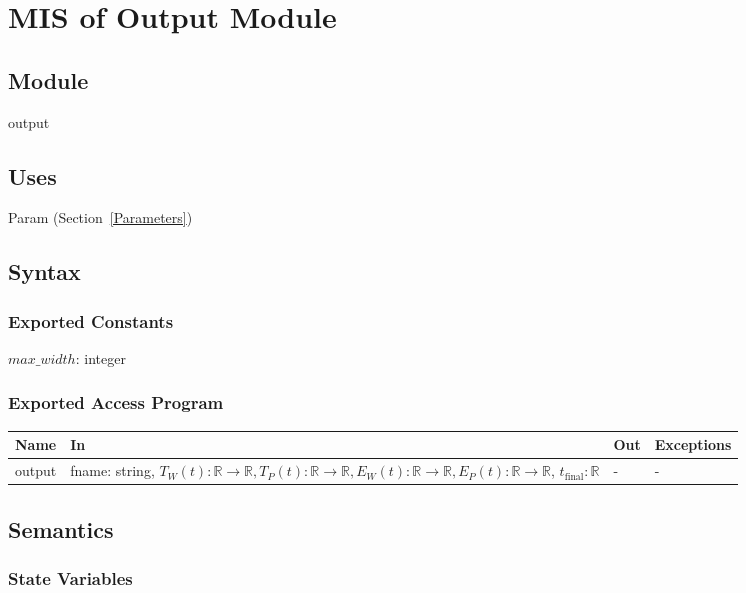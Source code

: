 \documentclass[12pt, titlepage]{article}
\begin{document}
\newpage

\section{MIS of Output Module} \label{Output}

\subsection{Module}

output

\subsection{Uses}

Param (Section~\ref{Parameters})

\subsection{Syntax}

\subsubsection{Exported Constants}

$max\_width$: integer

\subsubsection{Exported Access Program}

\begin{center}
\begin{tabular}{p{3cm} p{7cm} p{2cm} p{2cm}}
\hline
\textbf{Name} & \textbf{In} & \textbf{Out} & \textbf{Exceptions} \\
\hline
output & fname: string, $T_W(t):\mathbb{R} \rightarrow \mathbb{R},
                 T_P(t):\mathbb{R} \rightarrow \mathbb{R},
                 E_W(t):\mathbb{R} \rightarrow \mathbb{R},
       E_P(t):\mathbb{R} \rightarrow \mathbb{R}$, $t_\text{final}: \mathbb{R}$ & - & - \\
\hline
\end{tabular}
\end{center}

\subsection{Semantics}

\subsubsection{State Variables}
\end{document}

